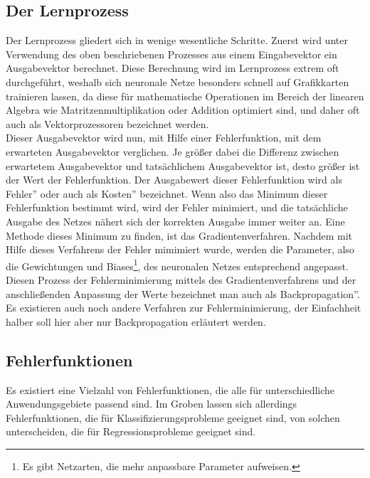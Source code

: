 \documentclass[11pt]{article}
\begin{document}
\subsection{Der Lernprozess}
Der Lernprozess gliedert sich in wenige wesentliche Schritte. Zuerst wird unter Verwendung des oben beschriebenen Prozesses aus einem Eingabevektor ein Ausgabevektor berechnet. Diese Berechnung wird im Lernprozess extrem oft durchgeführt, weshalb sich neuronale Netze besonders schnell auf Grafikkarten trainieren lassen, da diese für mathematische Operationen im Bereich der linearen Algebra wie Matritzenmultiplikation oder Addition optimiert sind, und daher oft auch als Vektorprozessoren bezeichnet werden.\\
Dieser Ausgabevektor wird nun, mit Hilfe einer Fehlerfunktion, mit dem erwarteten Ausgabevektor verglichen. Je größer dabei die Differenz zwischen erwartetem Ausgabevektor und tatsächlichem Ausgabevektor ist, desto größer ist der Wert der Fehlerfunktion. Der Ausgabewert dieser Fehlerfunktion wird als \glqq Fehler'' oder auch als \glqq Kosten'' bezeichnet. Wenn also das Minimum dieser Fehlerfunktion bestimmt wird, wird der Fehler minimiert, und die tatsächliche Ausgabe des Netzes nähert sich der korrekten Ausgabe immer weiter an.\newline
Eine Methode dieses Minimum zu finden, ist das Gradientenverfahren. Nachdem mit Hilfe dieses Verfahrens der Fehler mimimiert wurde, werden die Parameter, also die Gewichtungen und Biases\footnote{Es gibt Netzarten, die mehr anpassbare Parameter aufweisen.}, des neuronalen Netzes entsprechend angepasst. Diesen Prozess der Fehlerminimierung mittels des Gradientenverfahrens und der anschließenden Anpassung der Werte bezeichnet man auch als \glqq Backpropagation''. Es existieren auch noch andere Verfahren zur Fehlerminimierung, der Einfachheit halber soll hier aber nur Backpropagation erläutert werden.
\subsection{Fehlerfunktionen}
Es existiert eine Vielzahl von Fehlerfunktionen, die alle für unterschiedliche Anwendungsgebiete passend sind. Im Groben lassen sich allerdings Fehlerfunktionen, die für Klassifizierungsprobleme geeignet sind, von solchen unterscheiden, die für Regressionsprobleme geeignet sind.
\end{document}
